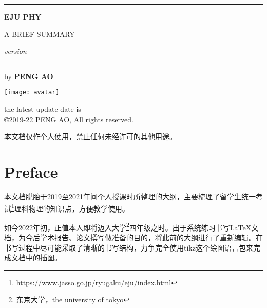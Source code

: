 
\begin{titlepage}
    \begin{center}
        \vspace{4cm}
        
        \rule{\textwidth}{1.2pt}
        
        \vspace{0.3cm}

        {\Huge \textbf{EJU PHY}}

        \vspace{0.3cm}

        {\LARGE A BRIEF SUMMARY}

        \vspace{0.3cm}

        {\Large \textit{version \version}}

        \rule{\textwidth}{1.2pt}

        \vspace{2cm}

        {\LARGE by \textbf{PENG AO}}

        \vfill

        \texttt{[image: avatar]}

        {\Large the latest update date is \updatedate\\
        \copyright2019-22 PENG AO, All rights reserved.}
    \end{center}
\end{titlepage}


\clearpage
\begin{center}
    本文档仅作个人使用，禁止任何未经许可的其他用途。
\end{center}


\clearpage
\chapter*{Preface}

本文档脱胎于2019至2021年间个人授课时所整理的大纲，主要梳理了留学生统一考试\footnote{https://www.jasso.go.jp/ryugaku/eju/index.html}理科物理的知识点，方便教学使用。

如今2022年初，正值本人即将迈入大学\footnote{东京大学，the university of tokyo}四年级之时。出于系统练习书写\LaTeX 文档，为今后学术报告、论文撰写做准备的目的，将此前的大纲进行了重新编辑。在书写过程中尽可能采取了清晰的书写结构，力争完全使用tikz这个绘图语言包来完成文档中的插图。

